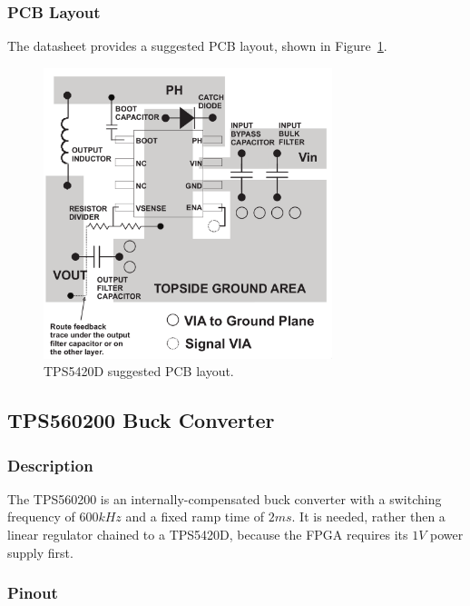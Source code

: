 \subsubsection{PCB Layout}
\label{sec:tps5420d-pcb}

The datasheet provides a suggested PCB layout, shown in Figure~\ref{fig:tps5420d-pcb}.

\begin{figure}[h]
        \centering
        \includegraphics[width=0.75\textwidth]{data/tps5420d-pcb.png}
        \caption{TPS5420D suggested PCB layout.}
        \label{fig:tps5420d-pcb}
\end{figure}

\subsection{TPS560200 Buck Converter}
\label{sec:tps560200}

\subsubsection{Description}
\label{sec:tps560200-description}

The TPS560200 is an internally-compensated buck converter with a switching frequency of
$600 \si{kHz}$ and a fixed ramp time of $2 \si{ms}$. It is needed, rather then a linear regulator
chained to a TPS5420D, because the FPGA requires its $1 \si{V}$ power supply first.

\subsubsection{Pinout}
\label{sec:tps560200-pinout}

